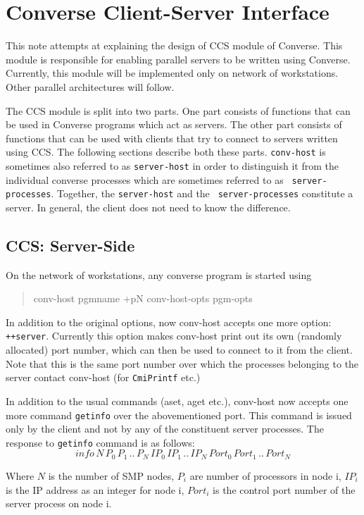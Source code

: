 \chapter{Converse Client-Server Interface}

This note attempts at explaining the design of CCS module of Converse. This
module is responsible for enabling parallel servers to be written using
Converse. Currently, this module will be implemented only on network of
workstations. Other parallel architectures will follow.

The CCS module is split into two parts. One part consists of functions that can
be used in Converse programs which act as servers. The other part consists of
functions that can be used with clients that try to connect to servers written
using CCS. The following sections describe both these parts. {\tt conv-host} is
sometimes also referred to as {\tt server-host} in order to distinguish it from
the individual converse processes which are sometimes referred to as {\tt
server-processes}. Together, the {\tt server-host} and the {\tt
server-processes} constitute a server. In general, the client does not need to
know the difference.


\section{CCS: Server-Side}

On the network of workstations, any converse program is started using
\begin{quotation} conv-host pgmname +pN conv-host-opts pgm-opts \end{quotation}
In addition to the original options, now conv-host accepts one more option:
{\tt ++server}.  Currently this option makes conv-host print out its own
(randomly allocated) port number, which can then be used to connect to it from
the client. Note that this is the same port number over which the processes
belonging to the server contact conv-host (for {\tt CmiPrintf} etc.)

In addition to the usual commands (aset, aget etc.), conv-host now accepts one
more command {\tt getinfo} over the abovementioned port. This command is issued
only by the client and not by any of the constituent server processes. The
response to {\tt getinfo} command is as follows: 
\[info \, N \, P_{0} \, P_{1} \, .. \, P_{N} \, IP_{0} \, IP_{1} \, .. \,
IP_{N} \, Port_{0} \, Port_{1} \, .. \, Port_{N} \]

Where \(N\)  is the number of SMP nodes, \(P_{i}\)  are number of processors in
node i, \(IP_{i}\) is the IP address as an integer for node i, \(Port_{i}\) is
the control port number of the server process on node i.

